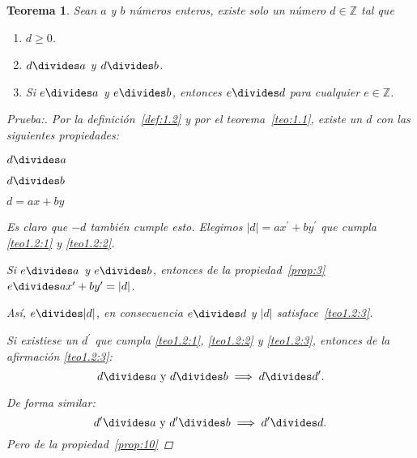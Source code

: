 \documentclass[oneside,a5paper]{memoir}
\newtheorem{theorem}{Teorema}[chapter] %
\begin{document}
\begin{theorem}\label{teo:1.2}
	Sean $a$ y $b$ números enteros, existe solo un número $d\in\mathbb{Z}$ tal que
	\begin{enumerate}[font={\bfseries},label={\arabic*)}]
		\item\label{teo1.2:1} $d\geq0$.
		\item\label{teo1.2:2} $d\divides a$ y $d\divides b$.
		\item\label{teo1.2:3} Si $e\divides a$ y $e\divides b$, entonces $e\divides d$ para cualquier $e\in\mathbb{Z}$.
	\end{enumerate}

	\begin{proof}[Prueba:]
		Por la definición~\ref{def:1.2} y por el teorema~\ref{teo:1.1}, existe un $d$ con las siguientes propiedades:
		\begin{multicols}{3}
			$d\divides a$
			
			$d\divides b$
			
			$d=ax+by$
		\end{multicols}
	\noindent
	Es claro que $-d$ también cumple esto. Elegimos $|d|=ax^{\prime}+by^{\prime}$ que cumpla \ref{teo1.2:1} y \ref{teo1.2:2}.
	
	\noindent
	Si $e\divides a$ y $e\divides b$, entonces de la propiedad~\ref{prop:3} $e\divides ax^{\prime}+by^{\prime}=|d|$.
	
	\noindent
	Así, $e\divides |d|$, en consecuencia $e\divides d$ y $|d|$ satisface~\ref*{teo1.2:3}.
	
	\noindent
	Si existiese un $d^{\prime}$ que cumpla \ref{teo1.2:1}, \ref{teo1.2:2} y \ref{teo1.2:3}, entonces de la afirmación \ref{teo1.2:3}:
	\[d\divides a\text{ y }d\divides b\implies d\divides d^{\prime}.\]
	
	\noindent
	De forma similar:
	\[d^{\prime}\divides a\text{ y }d^{\prime}\divides b\implies d^{\prime}\divides d.\]
	Pero de la propiedad~\ref{prop:10}
	\end{proof}
\end{theorem}
\end{document}
